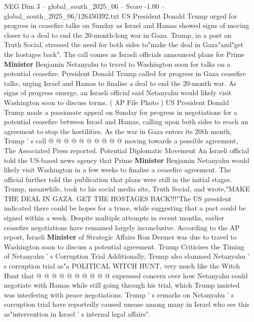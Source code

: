 \begin{textsample}{NEG Dim 3 – global\_south\_2025\_06 – Score -1.00 – global\_south\_2025\_06/126450392.txt}  \label{ex:f3_neg_263}
US President Donald Trump urged for progress in ceasefire talks on Sunday as Israel and Hamas showed signs of moving closer to a deal to end the 20-month-long war in Gaza.
Trump, in a post on Truth Social, stressed the need for both sides to"make the deal in Gaza"and"get the hostages back".
The call comes as Israeli officials announced plans for Prime \textbf{Minister} Benjamin Netanyahu to travel to Washington soon for talks on a potential ceasefire.
President Donald Trump called for progress in Gaza ceasefire talks, urging Israel and Hamas to finalise a deal to end the 20-month war.
As signs of progress emerge, an Israeli official said Netanyahu would likely visit Washington soon to discuss terms. ( AP File Photo ) US President Donald Trump made a passionate appeal on Sunday for progress in negotiations for a potential ceasefire between Israel and Hamas, calling upon both sides to reach an agreement to stop the hostilities.
As the war in Gaza enters its 20th month, Trump ' s call @ @ @ @ @ @ @ @ @ @ moving towards a possible agreement, The Associated Press reported.
Potential Diplomatic Movement An Israeli official told the US-based news agency that Prime \textbf{Minister} Benjamin Netanyahu would likely visit Washington in a few weeks to finalise a ceasefire agreement.
The official further told the publication that plans were still in the initial stages.
Trump, meanwhile, took to his social media site, Truth Social, and wrote,"MAKE THE DEAL IN GAZA.
GET THE HOSTAGES BACK!!!"The US president indicated there could be hopes for a truce, while suggesting that a pact could be signed within a week.
Despite multiple attempts in recent months, earlier ceasefire negotiations have remained largely inconclusive.
According to the AP report, Israeli \textbf{Minister} of Strategic Affairs Ron Dermer was due to travel to Washington soon to discuss a potential agreement.
Trump Criticises the Timing of Netanyahu ' s Corruption Trial Additionally, Trump also slammed Netanyahu ' s corruption trial as"a POLITICAL WITCH HUNT, very much like the Witch Hunt that @ @ @ @ @ @ @ @ @ @ expressed concern over how Netanyahu could negotiate with Hamas while still going through his trial, which Trump insisted was interfering with peace negotiations.
Trump ' s remarks on Netanyahu ' s corruption trial have reportedly caused unease among many in Israel who see this as"intervention in Israel ' s internal legal affairs".

\end{textsample}
